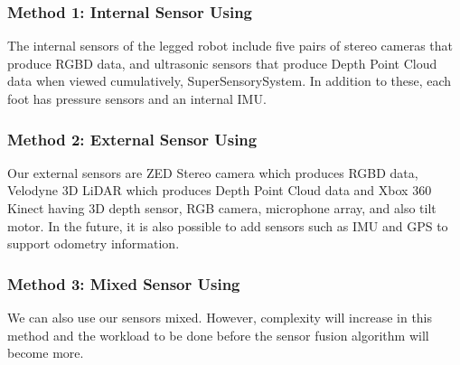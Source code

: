 \documentclass[12pt]{article}
\begin{document}
\subsubsection{Method 1: Internal Sensor Using}
The internal sensors of the legged robot include five pairs of stereo cameras that produce RGBD data, and ultrasonic sensors that produce Depth Point Cloud data when viewed cumulatively, SuperSensorySystem. In addition to these, each foot has pressure sensors and an internal IMU.

\subsubsection{Method 2: External Sensor Using}
Our external sensors are ZED Stereo camera which produces RGBD data, Velodyne 3D LiDAR which produces Depth Point Cloud data and Xbox 360 Kinect having 3D depth sensor, RGB camera, microphone array, and also tilt motor. In the future, it is also possible to add sensors such as IMU and GPS to support odometry information.

\subsubsection{Method 3: Mixed Sensor Using}
We can also use our sensors mixed. However, complexity will increase in this method and the workload to be done before the sensor fusion algorithm will become more.
\end{document}
